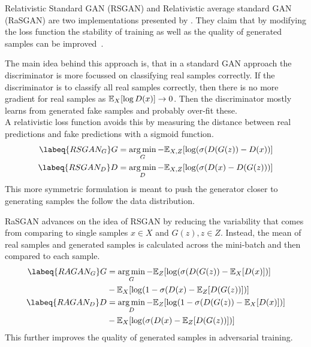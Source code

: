 Relativistic Standard GAN (RSGAN) and Relativistic average standard GAN (RaSGAN) are two implementations presented by \citeauthor*{RGAN}.
They claim that by modifying the loss function the stability of training as well as the quality of generated samples can be improved~\cite{RGAN}.

The main idea behind this approach is, that in a standard GAN approach the discriminator is more focussed on classifying real samples correctly.
If the discriminator is to classify all real samples correctly, then there is no more gradient for real samples as $ \mathbb{E}_X[\log D(x)] \rightarrow 0$.
Then the discriminator mostly learns from generated fake samples and probably over-fit these.\\
A relativistic loss function avoids this by measuring the distance between real predictions and fake predictions with a sigmoid function.
\begin{align}
    \labeq{RSGAN_G}
    G & = \argmin_G - \E_{X, Z}[\log(\sigma(D(G(z)) - D(x))] \\
    \labeq{RSGAN_D}
    D & = \argmin_D - \E_{X, Z}[\log(\sigma(D(x) - D(G(z)))] \\
\end{align}
This more symmetric formulation is meant to push the generator closer to generating samples the follow the data distribution.

RaSGAN advances on the idea of RSGAN by reducing the variability that comes from comparing to single samples $x \in X$ and $G(z), z \in Z$.
Instead, the mean of real samples and generated samples is calculated across the mini-batch and then compared to each sample.
\begin{align}
    \labeq{RAGAN_G}
    G & = \argmin_G - \E_Z[\log(\sigma(D(G(z)) - \E_X[D(x)])] \\
    & - \E_X[\log(1 - \sigma(D(x) - \E_Z[D(G(z))])]\\
    \labeq{RAGAN_D}
    D & = \argmin_D - \E_Z[\log(1 - \sigma(D(G(z)) - \E_X[D(x)])] \\
    & - \E_X[\log(\sigma(D(x) - \E_Z[D(G(z))])]\\
\end{align}
This further improves the quality of generated samples in adversarial training.

